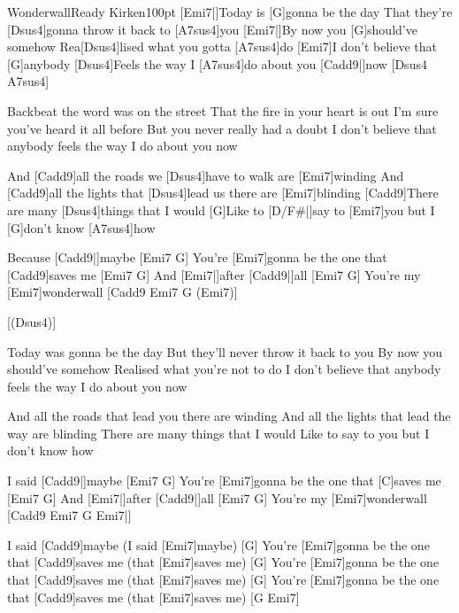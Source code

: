 \begin{song}{Wonderwall}{Ready Kirken}{100pt}
%
[Emi7|]{}Today is [G]gonna be the day
That they're [Dsus4]gonna throw it back to [A7sus4]you
[Emi7|]{}By now you [G]should've somehow
Rea[Dsus4]lised what you gotta [A7sus4]do
[Emi7]I don't believe that [G]anybody
[Dsus4]Feels the way I [A7sus4]do about you [Cadd9|]{now} [Dsus4 A7sus4]{}

%
Backbeat the word was on the street
That the fire in your heart is out
I'm sure you've heard it all before
But you never really had a doubt
I don't believe that anybody 
feels the way I do about you now

\verse{*}%
And [Cadd9]all the roads we [Dsus4]have to walk are [Emi7]winding
And [Cadd9]all the lights that [Dsus4]lead us there are [Emi7]blinding
[Cadd9]There are many [Dsus4]things that I would
[G]Like to [D/F#|]{say} to [Emi7]you
but I [G]don't know [A7sus4]how

\chorus%
Because [Cadd9|]{maybe} [Emi7 G]{}
You're [Emi7]gonna be the one that [Cadd9]saves me [Emi7 G]{}
And [Emi7|]{after} [Cadd9|]{all} [Emi7 G]{}
You're my [Emi7]wonderwall [Cadd9 Emi7 G (Emi7)]{}

[(Dsus4)]{}

%
Today was gonna be the day
But they'll never throw it back to you
By now you should've somehow
Realised what you're not to do
I don't believe that anybody
feels the way I do about you now

\verse{*}%
And all the roads that lead you there are winding
And all the lights that lead the way are blinding
There are many things that I would
Like to say to you
but I don't know how

\chorus%
\rl I said [Cadd9|]{maybe} [Emi7 G]{}
You're [Emi7]gonna be the one that [C]saves me [Emi7 G]{}
And [Emi7|]{after} [Cadd9|]{all} [Emi7 G]{}
You're my [Emi7]wonderwall [Cadd9 Emi7 G Emi7|]{}\rr{}

I said [Cadd9]maybe (I said [Emi7]maybe) [G]{}
You're [Emi7]gonna be the one that [Cadd9]saves me (that [Emi7]saves me) [G]{}
You're [Emi7]gonna be the one that [Cadd9]saves me (that [Emi7]saves me) [G]{}
You're [Emi7]gonna be the one that [Cadd9]saves me (that [Emi7]saves me) [G Emi7]{}
\end{song}
\vskip 20pt
\hfil
{}

